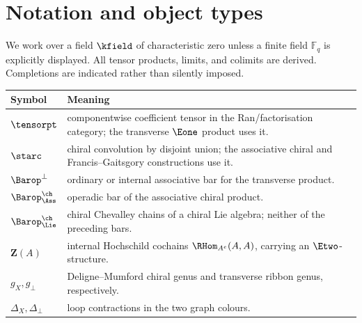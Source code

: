 \chapter*{Notation and object types}
We work over a field \(\kfield\) of characteristic zero unless a finite field \(\mathbb F_q\) is explicitly displayed.  All tensor products, limits, and colimits are derived.  Completions are indicated rather than silently imposed.

\begin{center}
\begin{tabularx}{0.96\textwidth}{>{\bfseries}p{}X}
\toprule
Symbol & Meaning\\
\midrule
\(\tensorpt\) & componentwise coefficient tensor in the Ran/factorisation category; the transverse \(\Eone\) product uses it.\\
\(\starc\) & chiral convolution by disjoint union; the associative chiral and Francis--Gaitsgory constructions use it.\\
\(\Barop^{\perp}\) & ordinary or internal associative bar for the transverse product.\\
\(\Barop^{\ch}_{\Ass}\) & operadic bar of the associative chiral product.\\
\(\Barop^{\ch}_{\Lie}\) & chiral Chevalley chains of a chiral Lie algebra; neither of the preceding bars.\\
\(\mathbf Z(A)\) & internal Hochschild cochains \(\RHom_{A^e}(A,A)\), carrying an \(\Etwo\)-structure.\\
\(g_X,g_\perp\) & Deligne--Mumford chiral genus and transverse ribbon genus, respectively.\\
\(\Delta_X,\Delta_\perp\) & loop contractions in the two graph colours.\\
\bottomrule
\end{tabularx}
\end{center}
